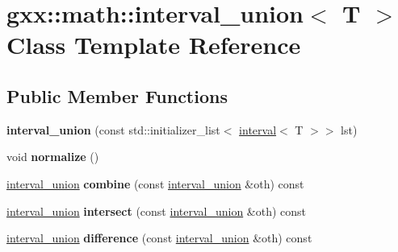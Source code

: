 \hypertarget{structgxx_1_1math_1_1interval__union}{}\section{gxx\+:\+:math\+:\+:interval\+\_\+union$<$ T $>$ Class Template Reference}
\label{structgxx_1_1math_1_1interval__union}
\subsection*{Public Member Functions}
\begin{DoxyCompactItemize}
\item 
{\bfseries interval\+\_\+union} (const std\+::initializer\+\_\+list$<$ \hyperlink{classgxx_1_1math_1_1interval}{interval}$<$ T $>$$>$ lst)\hypertarget{structgxx_1_1math_1_1interval__union_a5285ee25996b7c65be74777c18d4fbb8}{}\label{structgxx_1_1math_1_1interval__union_a5285ee25996b7c65be74777c18d4fbb8}

\item 
void {\bfseries normalize} ()\hypertarget{structgxx_1_1math_1_1interval__union_a2efc57abc91adbb25042645af94a9d44}{}\label{structgxx_1_1math_1_1interval__union_a2efc57abc91adbb25042645af94a9d44}

\item 
\hyperlink{structgxx_1_1math_1_1interval__union}{interval\+\_\+union} {\bfseries combine} (const \hyperlink{structgxx_1_1math_1_1interval__union}{interval\+\_\+union} \&oth) const \hypertarget{structgxx_1_1math_1_1interval__union_a37e786de658904827f20545cf768e10a}{}\label{structgxx_1_1math_1_1interval__union_a37e786de658904827f20545cf768e10a}

\item 
\hyperlink{structgxx_1_1math_1_1interval__union}{interval\+\_\+union} {\bfseries intersect} (const \hyperlink{structgxx_1_1math_1_1interval__union}{interval\+\_\+union} \&oth) const \hypertarget{structgxx_1_1math_1_1interval__union_a9becf8c9745085e834adacf3d6d6b4d8}{}\label{structgxx_1_1math_1_1interval__union_a9becf8c9745085e834adacf3d6d6b4d8}

\item 
\hyperlink{structgxx_1_1math_1_1interval__union}{interval\+\_\+union} {\bfseries difference} (const \hyperlink{structgxx_1_1math_1_1interval__union}{interval\+\_\+union} \&oth) const \hypertarget{structgxx_1_1math_1_1interval__union_a791c91aa14f0fbeae03de065404732d7}{}\label{structgxx_1_1math_1_1interval__union_a791c91aa14f0fbeae03de065404732d7}


\end{DoxyCompactItemize}

